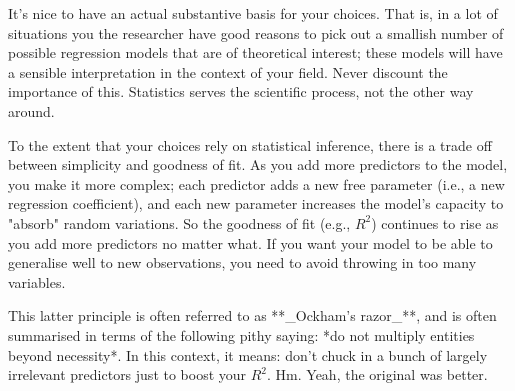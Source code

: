 \item It's nice to have an actual substantive basis for your choices. That is, in a lot of situations you the researcher have good reasons to pick out a smallish number of possible regression models that are of theoretical interest; these models will have a sensible interpretation in the context of your field. Never discount the importance of this. Statistics serves the scientific process, not the other way around. 
\item To the extent that your choices rely on statistical inference, there is a trade off between simplicity and goodness of fit. As you add more predictors to the model, you make it more complex; each predictor adds a new free parameter (i.e., a new regression coefficient), and each new parameter increases the model's capacity to "absorb" random variations. So the goodness of fit (e.g., $R^2$) continues to rise as you add more predictors no matter what. If you want your model to be able to generalise well to new observations, you need to avoid throwing in too many variables. 

This latter principle is often referred to as **_Ockham's razor_**, and is often summarised in terms of the following pithy saying: *do not multiply entities beyond necessity*. In this context, it means: don't chuck in a bunch of largely irrelevant predictors just to boost your $R^2$. Hm. Yeah, the original was better. 

